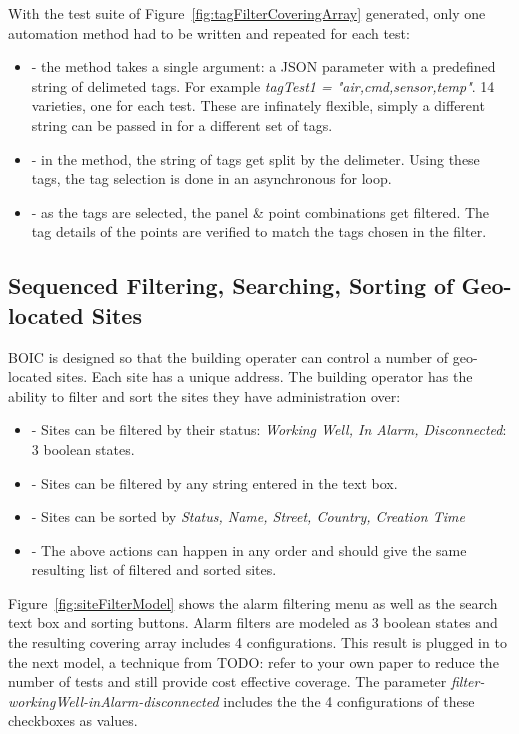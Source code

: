 \documentclass[conference]{IEEEtran}
\newcommand{\todo}[1]{}
\renewcommand{\todo}[1]{{\color{red} TODO: {#1}}}
\begin{document}
	With the test suite of Figure~\ref{fig:tagFilterCoveringArray} generated, only one automation method had to be written and repeated for each test:
	
	\begin{itemize}
		\item [] - the method takes a single argument: a JSON parameter with a predefined string of delimeted tags. For example \textit{tagTest1 = "air,cmd,sensor,temp"}. 14 varieties, one for each test. These are infinately flexible, simply a different string can be passed in for a different set of tags.
		\item [] - in the method, the string of tags get split by the delimeter. Using these tags, the tag selection is done in an asynchronous for loop. 
		\item [] - as the tags are selected, the panel \& point combinations get filtered. The tag details of the points are verified to match the tags chosen in the filter.
	\end{itemize}

	

	\subsection{Sequenced Filtering, Searching, Sorting of Geo-located Sites}

	BOIC is designed so that the building operater can control a number of geo-located sites. 
	Each site has a unique address. The building operator has the ability to filter and sort the sites they have administration over:

	\begin{itemize}
		\item [] - Sites can be filtered by their status: \textit{Working Well, In Alarm, Disconnected}: 3 boolean states.
		\item [] - Sites can be filtered by any string entered in the text box.
		\item [] - Sites can be sorted by \textit{Status, Name, Street, Country, Creation Time}
		\item [] - The above actions can happen in any order and should give the same resulting list of filtered and sorted sites.
	\end{itemize}

	Figure~\ref{fig:siteFilterModel} shows the alarm filtering menu as well as the search text box and sorting buttons. 
	Alarm filters are modeled as 3 boolean states and the resulting covering array includes 4 configurations. 
	This result is plugged in to the next model, a technique from \todo{refer to your own paper} to reduce the number of tests and still provide cost effective coverage.
	The parameter \textit{filter-workingWell-inAlarm-disconnected} includes the the 4 configurations of these checkboxes as values. 
\end{document}
